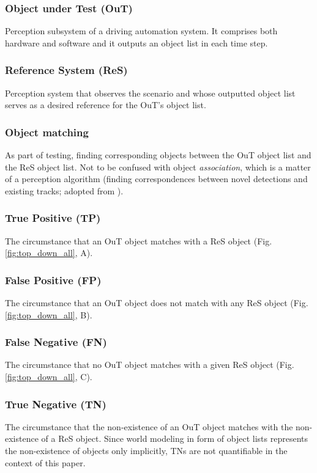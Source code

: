 \documentclass[conference]{IEEEtran}
\begin{document}
\subsubsection{Object under Test (OuT)} \label{def:out} Perception subsystem of a driving automation system. It comprises both hardware and software and it outputs an object list in each time step. 

\subsubsection{Reference System (ReS)}
\label{def:reference_system}
Perception system that observes the scenario and whose outputted object list serves as a desired reference for the OuT's object list. 

\subsubsection{Object matching} \label{def:association} 
As part of testing, finding corresponding objects between the OuT object list and the ReS object list.
Not to be confused with object \textit{association}, which is a matter of a perception algorithm (finding correspondences between novel detections and existing tracks; adopted from \cite{Luiten2020hota}).

\subsubsection{True Positive (TP)} \label{def:tp} The circumstance that an OuT object matches with a ReS object (Fig. \ref{fig:top_down_all}, A).

\subsubsection{False Positive (FP)} \label{def:fp} The circumstance that an OuT object does not match with any ReS object (Fig. \ref{fig:top_down_all}, B). 

\subsubsection{False Negative (FN)} \label{def:fn} The circumstance that no OuT object matches with a given ReS object (Fig. \ref{fig:top_down_all}, C).

\subsubsection{True Negative (TN)} \label{def:tn} The circumstance that the non-existence of an OuT object matches with the non-existence of a ReS object. Since world modeling in form of object lists represents the non-existence of objects only implicitly, TNs are not quantifiable in the context of this paper.
\end{document}
